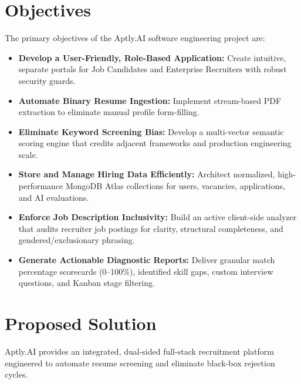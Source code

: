 \documentclass[12pt, a4paper]{article}
\begin{document}
\section{Objectives}
The primary objectives of the Aptly.AI software engineering project are:
\begin{itemize}[leftmargin=1.5em, itemsep=2pt]
    \item \textbf{Develop a User-Friendly, Role-Based Application:} Create intuitive, separate portals for Job Candidates and Enterprise Recruiters with robust security guards.
    \item \textbf{Automate Binary Resume Ingestion:} Implement stream-based PDF extraction to eliminate manual profile form-filling.
    \item \textbf{Eliminate Keyword Screening Bias:} Develop a multi-vector semantic scoring engine that credits adjacent frameworks and production engineering scale.
    \item \textbf{Store and Manage Hiring Data Efficiently:} Architect normalized, high-performance MongoDB Atlas collections for users, vacancies, applications, and AI evaluations.
    \item \textbf{Enforce Job Description Inclusivity:} Build an active client-side analyzer that audits recruiter job postings for clarity, structural completeness, and gendered/exclusionary phrasing.
    \item \textbf{Generate Actionable Diagnostic Reports:} Deliver granular match percentage scorecards (0--100\%), identified skill gaps, custom interview questions, and Kanban stage filtering.
\end{itemize}

\newpage

\section{Proposed Solution}
Aptly.AI provides an integrated, dual-sided full-stack recruitment platform engineered to automate resume screening and eliminate black-box rejection cycles.
\end{document}
